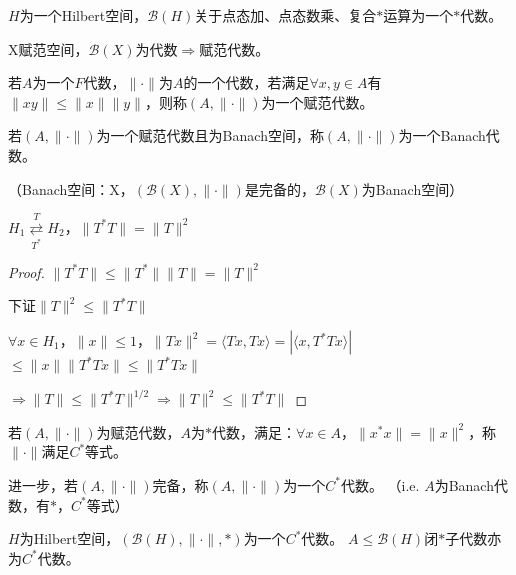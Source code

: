 \documentclass[lang=cn,a4paper,newtx,section]{elegantbook}
\begin{document}
\begin{example}
  $H$为一个Hilbert空间，$\mathcal{B}(H)$关于点态加、点态数乘、复合$*$运算为一个$*$代数。
\end{example}

\begin{example}
  X赋范空间，$\mathcal{B}(X)$为代数$\Rightarrow$赋范代数。
\end{example}

\begin{definition}
  若$A$为一个$F$代数，$\|\cdot\|$为$A$的一个代数，若满足$\forall x, y \in A$有$\|xy\| \leq \|x\| \|y\|$，则称$(A, \|\cdot\|)$为一个赋范代数。
\end{definition}

\begin{definition}
  若$(A, \|\cdot\|)$为一个赋范代数且为Banach空间，称$(A, \|\cdot\|)$为一个Banach代数。
  
  （Banach空间：X，$(\mathcal{B}(X), \|\cdot\|)$是完备的，$\mathcal{B}(X)$为Banach空间）
\end{definition}

\begin{proposition}
  $H_1 \underset{T^*}{\overset{T}{\rightleftarrows}} H_2$，$\|T^*T\| = \|T\|^2$
\end{proposition}

\begin{proof}
  $\|T^*T\| \leq \|T^*\| \|T\| = \|T\|^2$
  
  下证$\|T\|^2 \leq \|T^*T\|$
  
  $\forall x \in H_1$，$\|x\| \leq 1$，$\|Tx\|^2 = \langle Tx, Tx \rangle = |\langle x, T^*Tx \rangle|$
  $\leq \|x\| \|T^*Tx\| \leq \|T^*Tx\|$
  
  $\Rightarrow \|T\| \leq \|T^*T\|^{1/2} \Rightarrow \|T\|^2 \leq \|T^*T\|$
\end{proof}

\begin{definition}
  若$(A, \|\cdot\|)$为赋范代数，$A$为$*$代数，满足：$\forall x \in A$，$\|x^*x\| = \|x\|^2$，称$\|\cdot\|$满足$C^*$等式。
  
  进一步，若$(A, \|\cdot\|)$完备，称$(A, \|\cdot\|)$为一个$C^*$代数。
  （i.e. $A$为Banach代数，有$*$，$C^*$等式）
\end{definition}

\begin{example}
  $H$为Hilbert空间，$(\mathcal{B}(H), \|\cdot\|, *)$为一个$C^*$代数。
  $A \leq \mathcal{B}(H)$闭$*$子代数亦为$C^*$代数。
\end{example}
\end{document}
